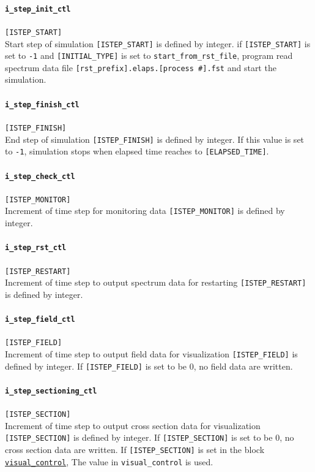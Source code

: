 \paragraph{\tt i\_step\_init\_ctl}
\label{href_t:i_step_init_ctl}
\verb|[ISTEP_START]| \\
Start step of simulation \verb|[ISTEP_START]| is defined by integer. if \verb|[ISTEP_START]| is set to {\tt -1} and \verb|[INITIAL_TYPE]| is set to \verb|start_from_rst_file|, program read spectrum data file \verb|[rst_prefix].elaps.[process #].fst| and start the simulation.

\paragraph{\tt i\_step\_finish\_ctl}
\label{href_t:i_step_finish_ctl}
\verb|[ISTEP_FINISH]| \\
End step of simulation \verb|[ISTEP_FINISH]| is defined by integer. If this value is set to  {\tt -1}, simulation stops when elapsed time reaches to \verb|[ELAPSED_TIME]|.

\paragraph{\tt i\_step\_check\_ctl}
\label{href_t:i_step_check_ctl}
\verb|[ISTEP_MONITOR]| \\
Increment of time step for monitoring data \verb|[ISTEP_MONITOR]| is defined by integer.

\paragraph{\tt i\_step\_rst\_ctl}
\label{href_t:i_step_rst_ctl}
\verb|[ISTEP_RESTART]| \\
Increment of time step to output spectrum data for restarting \verb|[ISTEP_RESTART]| is defined by integer.

\paragraph{\tt i\_step\_field\_ctl}
\label{href_t:i_step_field_ctl}
\verb|[ISTEP_FIELD]| \\
Increment of time step to output field data for visualization \verb|[ISTEP_FIELD]| is defined by integer. If \verb|[ISTEP_FIELD]| is set to be 0, no field data are written.

\paragraph{\tt i\_step\_sectioning\_ctl}
\label{href_t:i_step_sectioning_ctl}
\verb|[ISTEP_SECTION]| \\
Increment of time step to output cross section data for visualization \verb|[ISTEP_SECTION]| is defined by integer. If \verb|[ISTEP_SECTION]| is set to be 0, no cross section data are written. If \verb|[ISTEP_SECTION]| is set in the block \hyperref[href_i:visual_control]{\tt visual\_control}, The value in {\tt visual\_control} is used.

